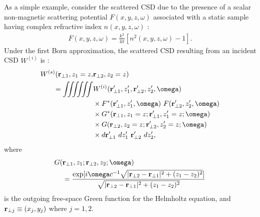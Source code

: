 \documentclass{iucr}              %
\begin{document}
As a simple example, consider the scattered CSD due to the presence of a scalar non-magnetic scattering potential $F(x,y,z,\omega)$ associated with a static sample having complex refractive index $n(x,y,z,\omega)$ \cite{mandel_wolf}:
\begin{equation}
\begin{aligned}
\label{eq:ScatteringPotential}
F(x,y,z,\omega)=\frac{k^2}{4\pi}[n^2(x,y,z,\omega)-1].
\end{aligned}
\end{equation}
Under the first Born approximation, the scattered CSD resulting from an incident CSD $W^{(i)}$ is \cite{wolf_thin_book}:
\begin{equation}
\begin{aligned}
W^{(s)} ({\bf r}_{\perp 1}, z_1=z, & {\bf r}_{\perp 2},z_2=z) \\ 
=  \int \!\!\! \int \!\!\! \int \!\!\! \int \!\!\! \int \!\!\! \int &  W^{(i)}({\bf r}_{\perp 1}',z_1',{\bf r}_{\perp 2}',z_2',\omega)
\\ &\times F^*({\bf r}_{\perp 1}',z_1',\omega)~F({\bf r}_{\perp 2}',z_2',\omega) \\ &\times G^*({\bf r}_{\perp 1},z_1=z;{\bf r}_{\perp 1}',z'_1=z;\omega) \\ &\times G({\bf r}_{\perp 2},z_2=z;{\bf r}_{\perp 2}',z'_2=z;\omega) \\ &\times d{\bf r}_{\perp 1}'~dz'_1~{\bf r}_{\perp 2}'~dz'_2,
\label{eq:CSDScatteringFirstBornApproximation}
\end{aligned}
\end{equation}
where
\begin{equation}
\begin{aligned}
G( & {\bf r}_{\perp 1},z_1; {\bf r}_{\perp 2},z_2;\omega) \\ &=\frac{\exp[i \omega c^{-1}\sqrt{ | {\bf r}_{\perp 2}-{\bf r}_{\perp 1}|^2+(z_1-z_2)^2}]}{\sqrt{| {\bf r}_{\perp 2}-{\bf r}_{\perp 1}|^2+(z_1-z_2)^2}}
\end{aligned}
\end{equation}
is the outgoing free-space Green function for the Helmholtz equation, and  ${\bf r}_{\perp j}\equiv(x_j,y_j)$ where $j=1,2$.
\end{document}
